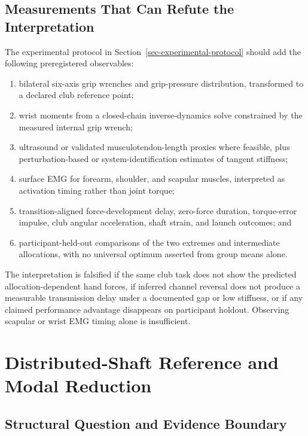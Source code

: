 \documentclass[
  letterpaper,
]{report}
\providecommand{\tightlist}{%
  \setlength{\itemsep}{0pt}\setlength{\parskip}{0pt}}
\begin{document}
\section{Measurements That Can Refute the
Interpretation}\label{measurements-that-can-refute-the-interpretation}

The experimental protocol in Section~\ref{sec-experimental-protocol}
should add the following preregistered observables:

\begin{enumerate}
\def\labelenumi{\arabic{enumi}.}
\tightlist
\item
  bilateral six-axis grip wrenches and grip-pressure distribution,
  transformed to a declared club reference point;
\item
  wrist moments from a closed-chain inverse-dynamics solve constrained
  by the measured internal grip wrench;
\item
  ultrasound or validated musculotendon-length proxies where feasible,
  plus perturbation-based or system-identification estimates of tangent
  stiffness;
\item
  surface EMG for forearm, shoulder, and scapular muscles, interpreted
  as activation timing rather than joint torque;
\item
  transition-aligned force-development delay, zero-force duration,
  torque-error impulse, club angular acceleration, shaft strain, and
  launch outcomes; and
\item
  participant-held-out comparisons of the two extremes and intermediate
  allocations, with no universal optimum asserted from group means
  alone.
\end{enumerate}

The interpretation is falsified if the same club task does not show the
predicted allocation-dependent hand forces, if inferred channel reversal
does not produce a measurable transmission delay under a documented gap
or low stiffness, or if any claimed performance advantage disappears on
participant holdout. Observing scapular or wrist EMG timing alone is
insufficient.

\chapter{Distributed-Shaft Reference and Modal
Reduction}\label{sec-shaft-beam-reference}

\section{Structural Question and Evidence
Boundary}\label{structural-question-and-evidence-boundary}
\end{document}
